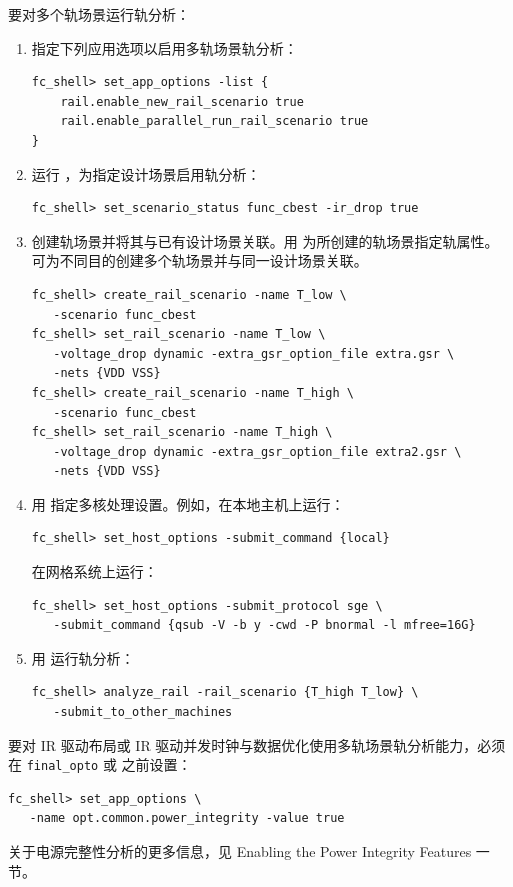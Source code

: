 要对多个轨场景运行轨分析：
\begin{enumerate}
  \item 指定下列应用选项以启用多轨场景轨分析：
\begin{lstlisting}
fc_shell> set_app_options -list {
    rail.enable_new_rail_scenario true
    rail.enable_parallel_run_rail_scenario true
}
\end{lstlisting}
  \item 运行  ，为指定设计场景启用轨分析：
\begin{lstlisting}
fc_shell> set_scenario_status func_cbest -ir_drop true
\end{lstlisting}
  \item 创建轨场景并将其与已有设计场景关联。用  为所创建的轨场景指定轨属性。可为不同目的创建多个轨场景并与同一设计场景关联。
\begin{lstlisting}
fc_shell> create_rail_scenario -name T_low \
   -scenario func_cbest
fc_shell> set_rail_scenario -name T_low \
   -voltage_drop dynamic -extra_gsr_option_file extra.gsr \
   -nets {VDD VSS}
fc_shell> create_rail_scenario -name T_high \
   -scenario func_cbest
fc_shell> set_rail_scenario -name T_high \
   -voltage_drop dynamic -extra_gsr_option_file extra2.gsr \
   -nets {VDD VSS}
\end{lstlisting}
  \item 用 \cmd{set\_host\_options} 指定多核处理设置。例如，在本地主机上运行：
\begin{lstlisting}
fc_shell> set_host_options -submit_command {local}
\end{lstlisting}
在网格系统上运行：
\begin{lstlisting}
fc_shell> set_host_options -submit_protocol sge \
   -submit_command {qsub -V -b y -cwd -P bnormal -l mfree=16G}
\end{lstlisting}
  \item 用 \cmd{analyze\_rail} 运行轨分析：
\begin{lstlisting}
fc_shell> analyze_rail -rail_scenario {T_high T_low} \
   -submit_to_other_machines
\end{lstlisting}
\end{enumerate}

\begin{noteBox}
要对 IR 驱动布局或 IR 驱动并发时钟与数据优化使用多轨场景轨分析能力，必须在   \texttt{final\_opto} 或  之前设置：
\begin{lstlisting}
fc_shell> set_app_options \
   -name opt.common.power_integrity -value true
\end{lstlisting}
关于电源完整性分析的更多信息，见 Enabling the Power Integrity Features 一节。
\end{noteBox}

